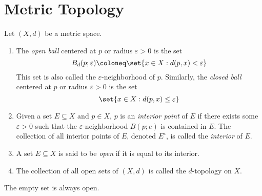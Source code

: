 \section{Metric Topology} \label{sec:topology}
\begin{definition}
    Let $(X, d)$ be a metric space.
    \begin{enumerate}
        \item The \emph{open ball} centered at $p$ or radius
        $\varepsilon > 0$ is the set \[
            B_d(p; \varepsilon) \coloneq \set{x \in X : d(p, x)
                < \varepsilon}
        \] This set is also called the $\varepsilon$-neighborhood of $p$.
        Similarly, the \emph{closed ball} centered at $p$ or radius
        $\varepsilon > 0$ is the set \[
            \set{x \in X : d(p, x) \le \varepsilon}
        \]
        \item Given a set $E \subseteq X$ and $p \in X$, $p$ is an
        \emph{interior point} of $E$ if there exists some $\varepsilon > 0$
        such that the $\varepsilon$-neighborhood $B(p; e)$ is contained in
        $E$.
        The collection of all interior points of $E$, denoted $E^\circ$, is
        called the \emph{interior} of $E$.
        \item A set $E \subseteq X$ is said to be \emph{open} if it is
        equal to its interior.
        \item The collection of all open sets of $(X, d)$ is called the
        $d$-topology on $X$.
    \end{enumerate}
\end{definition}

\begin{remark}
    The empty set is always open.
\end{remark}

